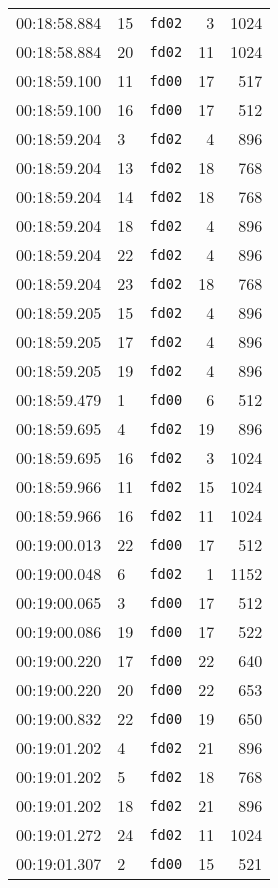 \documentclass{article}
\begin{document}
\begin{longtable}{lllrr}
00:18:58.884 & 15 & \texttt{fd02} & 3 & 1024 \\
00:18:58.884 & 20 & \texttt{fd02} & 11 & 1024 \\
00:18:59.100 & 11 & \texttt{fd00} & 17 & 517 \\
00:18:59.100 & 16 & \texttt{fd00} & 17 & 512 \\
00:18:59.204 & 3 & \texttt{fd02} & 4 & 896 \\
00:18:59.204 & 13 & \texttt{fd02} & 18 & 768 \\
00:18:59.204 & 14 & \texttt{fd02} & 18 & 768 \\
00:18:59.204 & 18 & \texttt{fd02} & 4 & 896 \\
00:18:59.204 & 22 & \texttt{fd02} & 4 & 896 \\
00:18:59.204 & 23 & \texttt{fd02} & 18 & 768 \\
00:18:59.205 & 15 & \texttt{fd02} & 4 & 896 \\
00:18:59.205 & 17 & \texttt{fd02} & 4 & 896 \\
00:18:59.205 & 19 & \texttt{fd02} & 4 & 896 \\
00:18:59.479 & 1 & \texttt{fd00} & 6 & 512 \\
00:18:59.695 & 4 & \texttt{fd02} & 19 & 896 \\
00:18:59.695 & 16 & \texttt{fd02} & 3 & 1024 \\
00:18:59.966 & 11 & \texttt{fd02} & 15 & 1024 \\
00:18:59.966 & 16 & \texttt{fd02} & 11 & 1024 \\
00:19:00.013 & 22 & \texttt{fd00} & 17 & 512 \\
00:19:00.048 & 6 & \texttt{fd02} & 1 & 1152 \\
00:19:00.065 & 3 & \texttt{fd00} & 17 & 512 \\
00:19:00.086 & 19 & \texttt{fd00} & 17 & 522 \\
00:19:00.220 & 17 & \texttt{fd00} & 22 & 640 \\
00:19:00.220 & 20 & \texttt{fd00} & 22 & 653 \\
00:19:00.832 & 22 & \texttt{fd00} & 19 & 650 \\
00:19:01.202 & 4 & \texttt{fd02} & 21 & 896 \\
00:19:01.202 & 5 & \texttt{fd02} & 18 & 768 \\
00:19:01.202 & 18 & \texttt{fd02} & 21 & 896 \\
00:19:01.272 & 24 & \texttt{fd02} & 11 & 1024 \\
00:19:01.307 & 2 & \texttt{fd00} & 15 & 521 \\

\end{longtable}
\end{document}
